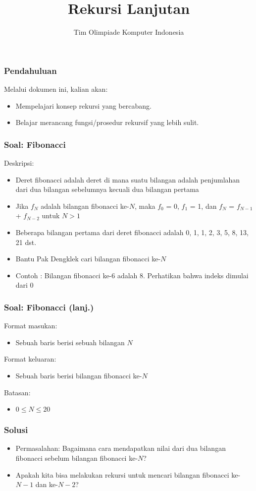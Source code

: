 \documentclass{beamer}
\title{Rekursi Lanjutan}
\author{Tim Olimpiade Komputer Indonesia}
\date{}
\begin{document}
\begin{frame}
\titlepage
\end{frame}

\begin{frame}
\frametitle{Pendahuluan}
Melalui dokumen ini, kalian akan:
\begin{itemize}
    \item Mempelajari konsep rekursi yang bercabang.
    \item Belajar merancang fungsi/prosedur rekursif yang lebih sulit.
\end{itemize}
\end{frame}

\begin{frame}
\frametitle{Soal: Fibonacci}
Deskripsi:
\begin{itemize}
        \item Deret fibonacci adalah deret di mana suatu bilangan adalah penjumlahan dari dua bilangan sebelumnya kecuali dua bilangan pertama
        \item Jika $f_N$ adalah bilangan fibonacci ke-$N$, maka $f_0$ = 0, $f_1$ = 1, dan $f_N$ = $f_{N-1}$ + $f_{N-2}$ untuk $N > 1$
        \item Beberapa bilangan pertama dari deret fibonacci adalah 0, 1, 1, 2, 3, 5, 8, 13, 21 dst.
        \item Bantu Pak Dengklek cari bilangan fibonacci ke-$N$
        \item Contoh : Bilangan fibonacci ke-6 adalah 8. Perhatikan bahwa indeks dimulai dari 0
\end{itemize}
\end{frame}

\begin{frame}
\frametitle{Soal: Fibonacci (lanj.) }
Format masukan:
\begin{itemize}
        \item Sebuah baris berisi sebuah bilangan $N$
\end{itemize}
Format keluaran:
\begin{itemize}
        \item Sebuah baris berisi bilangan fibonacci ke-$N$
\end{itemize}
Batasan:
\begin{itemize}
        \item $0 \le N \le 20$
\end{itemize}
\end{frame}

\begin{frame}
\frametitle{Solusi}
\begin{itemize}
    \item Permasalahan: Bagaimana cara mendapatkan nilai dari dua bilangan fibonacci sebelum bilangan fibonacci ke-$N$?
    \item Apakah kita bisa melakukan rekursi untuk mencari bilangan fibonacci ke-${N-1}$ dan ke-${N-2}$?
\end{itemize}
\end{frame}
\end{document}
